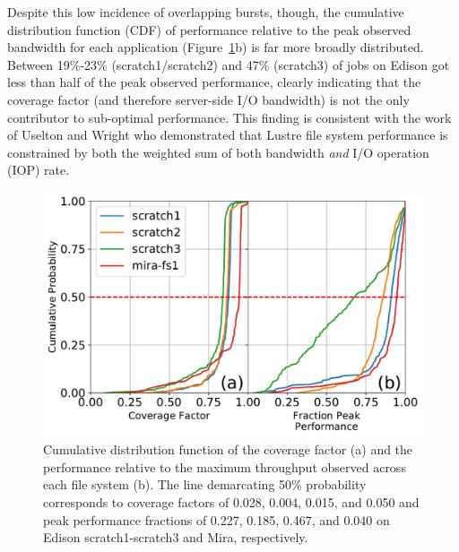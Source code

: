 Despite this low incidence of overlapping bursts, though, the cumulative
distribution function (CDF) of performance relative to the peak observed
bandwidth for each application (Figure~\ref{fig:cdfs}b) is far more broadly distributed.
Between 19\%-23\% (scratch1/scratch2) and 47\% (scratch3) of jobs on Edison got less than half of the peak observed performance, clearly indicating that the coverage factor (and therefore server-side
I/O bandwidth) is not the only contributor to sub-optimal performance.  
This finding is consistent with
the work of Uselton and Wright\cite{Uselton2013} who demonstrated that Lustre
file system performance is constrained by both the weighted sum of both bandwidth
\emph{and} I/O operation (IOP) rate.  

\begin{figure}[t]
    \centering
    \includegraphics[width=\columnwidth]{figs/cdf-both.pdf}
    \caption{Cumulative distribution function of the coverage factor (a) and the
    performance relative to the maximum throughput observed across each file system
    (b).  The line demarcating 50\% probability corresponds to coverage factors of
    0.028, 0.004, 0.015, and 0.050 and peak performance fractions of 0.227, 0.185,
    0.467, and 0.040 on Edison scratch1-scratch3 and Mira, respectively.}
    \label{fig:cdfs}
\end{figure}

